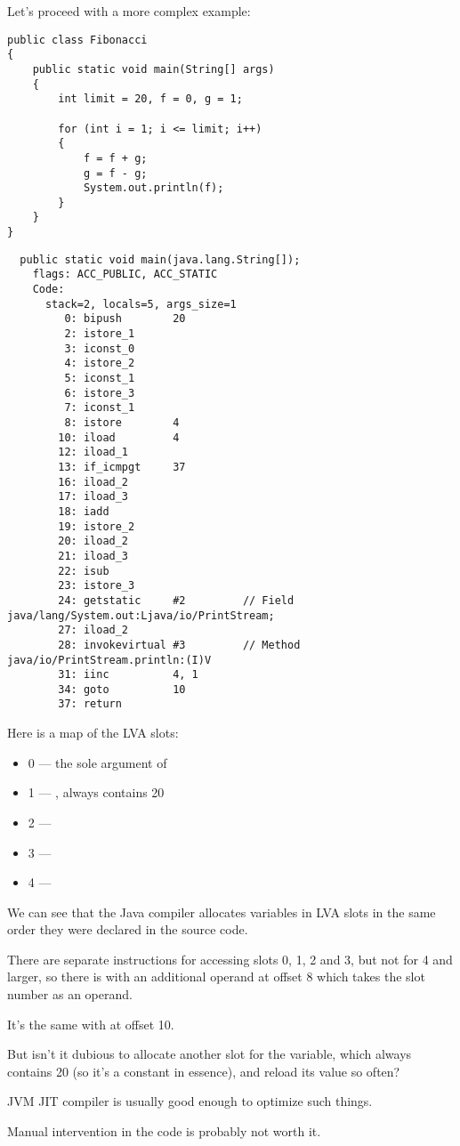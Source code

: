 Let's proceed with a more complex example:


\begin{lstlisting}
public class Fibonacci
{
	public static void main(String[] args)
	{ 
		int limit = 20, f = 0, g = 1;

		for (int i = 1; i <= limit; i++)
		{
			f = f + g;
			g = f - g;
			System.out.println(f); 
		}
	}
}
\end{lstlisting}

\begin{lstlisting}
  public static void main(java.lang.String[]);
    flags: ACC_PUBLIC, ACC_STATIC
    Code:
      stack=2, locals=5, args_size=1
         0: bipush        20
         2: istore_1      
         3: iconst_0      
         4: istore_2      
         5: iconst_1      
         6: istore_3      
         7: iconst_1      
         8: istore        4
        10: iload         4
        12: iload_1       
        13: if_icmpgt     37
        16: iload_2       
        17: iload_3       
        18: iadd          
        19: istore_2      
        20: iload_2       
        21: iload_3       
        22: isub          
        23: istore_3      
        24: getstatic     #2         // Field java/lang/System.out:Ljava/io/PrintStream;
        27: iload_2       
        28: invokevirtual #3         // Method java/io/PrintStream.println:(I)V
        31: iinc          4, 1
        34: goto          10
        37: return        
\end{lstlisting}
        
Here is a map of the \ac{LVA} slots:


\begin{itemize}
\item 0 --- the sole argument of \main
\item 1 --- , always contains 20
\item 2 --- 
\item 3 --- 
\item 4 --- 
\end{itemize}

We can see that the Java compiler allocates variables in \ac{LVA} slots in the same order 
they were declared in the source code.


There are separate  instructions for accessing slots 0, 1, 2 and 3, 
but not for 4 and larger, so there is  with an additional operand at offset 8 
which takes the slot number as an operand.

It's the same with  at offset 10.


But isn't it dubious to allocate another slot for the  variable, which 
always contains 20 (so it's a constant in essence), and reload its value so often?

\ac{JVM} \ac{JIT} compiler is usually good enough to optimize such things.

Manual intervention in the code is probably not worth it.


